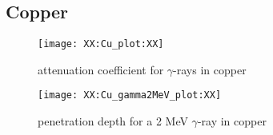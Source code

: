 \subsection{Copper}

\begin{figure}[h]
\centering
	\texttt{[image: XX:Cu\_plot:XX]}
	\caption[Cu interaction]{attenuation coefficient for $\gamma$-rays in copper}
	\label{fig:Cugammaplot}
\end{figure}

\begin{figure}[h]
\centering
	\texttt{[image: XX:Cu\_gamma2MeV\_plot:XX]}
	\caption[Cu interaction 2 MeV]{penetration depth for a 2 MeV $\gamma$-ray in copper}
	\label{fig:Cugamma2MeVplot}
\end{figure}

